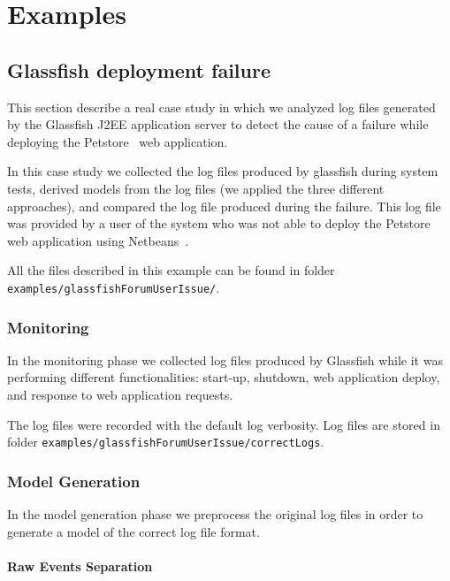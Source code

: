 \chapter{Examples}
\label{ch:examples}
\section{Glassfish deployment failure}

This section describe a real case study in which we analyzed log
files generated by the Glassfish J2EE application server to detect
the cause of a failure while deploying the Petstore~\cite{petstore} web
application.

In this case study we collected the log files produced by glassfish
during system tests, derived models from the log files (we applied
the three different approaches), and compared the log file produced
during the failure. This log file was provided by a user of the
system who was not able to deploy the Petstore web application using
Netbeans~\cite{GNetbeansCaseStudy:WEBSITE:2008}.

All the files described in this example can be found in folder \newline
\texttt{examples/glassfishForumUserIssue/}.

\subsection{Monitoring}

In the monitoring phase we collected log files produced by Glassfish
while it was performing different functionalities: start-up, shutdown,
web application deploy, and response to web application requests.

The log files were recorded with the default log verbosity. Log files are
stored in folder
\texttt{examples/glassfish\-ForumUserIssue/correctLogs}.



\subsection{Model Generation}

In the model generation phase we preprocess the original log files in
order to generate a model of the correct log file format.

\subsubsection*{Raw Events Separation}

